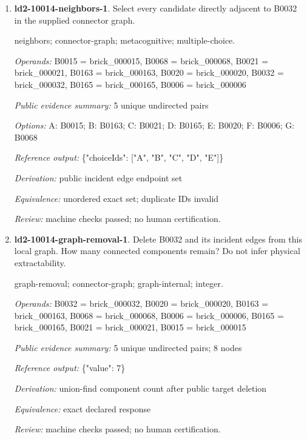 \begin{enumerate}
\par{\small interface; connector-graph; metacognitive; single-choice.\par\textit{Operands:} B0067 = brick\_000067, B0082 = brick\_000082\par\textit{Public evidence summary:} \{"connectorRecord": \{"family": "stud", "aConnector": 5, "bConnector": 9\}, "scope": "Upstream connector tolerances and inset mesh intersections; unknown parts remain explicit, separate scene objects are not glued together; no load/force validation."\}\par\textit{Options:} A: axle; B: fixed; C: hinge; D: stud; E: ball\par\textit{Reference output:} \{"choiceId": "D"\}\par\textit{Derivation:} public connectorRecord.family equality\par\textit{Equivalence:} exact declared response\par\textit{Review:} machine checks passed; no human certification.}
\item \textbf{ld2-10014-neighbors-1}. Select every candidate directly adjacent to B0032 in the supplied connector graph.
\par{\small neighbors; connector-graph; metacognitive; multiple-choice.\par\textit{Operands:} B0015 = brick\_000015, B0068 = brick\_000068, B0021 = brick\_000021, B0163 = brick\_000163, B0020 = brick\_000020, B0032 = brick\_000032, B0165 = brick\_000165, B0006 = brick\_000006\par\textit{Public evidence summary:} 5 unique undirected pairs\par\textit{Options:} A: B0015; B: B0163; C: B0021; D: B0165; E: B0020; F: B0006; G: B0068\par\textit{Reference output:} \{"choiceIds": ["A", "B", "C", "D", "E"]\}\par\textit{Derivation:} public incident edge endpoint set\par\textit{Equivalence:} unordered exact set; duplicate IDs invalid\par\textit{Review:} machine checks passed; no human certification.}
\item \textbf{ld2-10014-graph-removal-1}. Delete B0032 and its incident edges from this local graph. How many connected components remain? Do not infer physical extractability.
\par{\small graph-removal; connector-graph; graph-internal; integer.\par\textit{Operands:} B0032 = brick\_000032, B0020 = brick\_000020, B0163 = brick\_000163, B0068 = brick\_000068, B0006 = brick\_000006, B0165 = brick\_000165, B0021 = brick\_000021, B0015 = brick\_000015\par\textit{Public evidence summary:} 5 unique undirected pairs; 8 nodes\par\textit{Reference output:} \{"value": 7\}\par\textit{Derivation:} union-find component count after public target deletion\par\textit{Equivalence:} exact declared response\par\textit{Review:} machine checks passed; no human certification.}

\end{enumerate}
